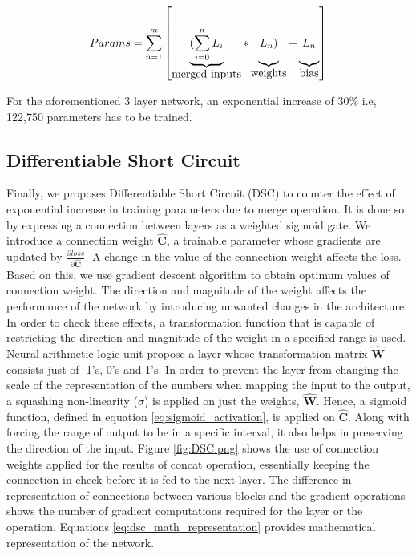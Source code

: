 \documentclass{article}
\let\oldhat\hat
\renewcommand{\hat}[1]{\oldhat{\mathbf{#1}}}
\begin{document}
\begin{equation}
\label{eq:gsc_params}
Params= \sum_{n=1}^{m}\left[
\underbrace{(\sum_{i=0}^{n}L_{i}\rule[-12pt]{0pt}{5pt}}_{\mbox{merged inputs}}
*\underbrace{L_{n})\rule[-12pt]{0pt}{5pt}}_{\mbox{weights}}
+\underbrace{L_{n}\rule[-12pt]{0pt}{5pt}}_{\mbox{bias}}\right]
\end{equation}

For the aforementioned 3 layer network, an exponential increase of 30\% i.e, 122,750 parameters has to be trained.

\subsection{Differentiable Short Circuit}
Finally, we proposes Differentiable Short Circuit (DSC) to counter the effect of exponential increase in training parameters due to merge operation. It is done so by expressing a connection between layers as a weighted sigmoid gate. We introduce a connection weight $\hat{C}$, a trainable parameter whose gradients are updated by $\frac{\partial loss}{\partial \hat{C}}$. A change in the value of the connection weight affects the loss. Based on this, we use gradient descent algorithm to obtain optimum values of connection weight. The direction and magnitude of the weight affects the performance of the network by introducing unwanted changes in the architecture. In order to check these effects, a transformation function that is capable of restricting the direction and magnitude of the weight in a specified range is used. Neural arithmetic logic unit \cite{Trask2018NeuralAL} propose a layer whose transformation matrix $\hat{W}$ consists just of -1's, 0's and 1's. In order to prevent the layer from changing the scale of the representation of the numbers when mapping the input to the output, a squashing non-linearity ($\sigma$) is applied on just the weights, $\hat{W}$.  Hence, a sigmoid function, defined in equation \ref{eq:sigmoid_activation}, is applied on $\hat{C}$. Along with forcing the range of output to be in a specific interval, it also helps in preserving the direction of the input. Figure \ref{fig:DSC.png} shows the use of connection weights applied for the results of concat operation, essentially keeping the connection in check before it is fed to the next layer. The difference in representation of connections between various blocks and the gradient operations shows the number of gradient computations required for the layer or the operation. Equations \ref{eq:dsc_math_representation} provides mathematical representation of the network.
\end{document}
